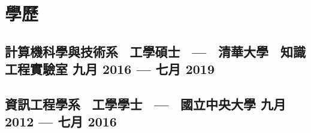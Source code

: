\section{學歷}
\subsection*{計算機科學與技術系 \, 工學碩士 \, --- \, {\normalsize \normalfont 清華大學 \ 知識工程實驗室} \hfill 九月 2016 --- 七月 2019} 
\vspace{0.1cm}
\subsection*{資訊工程學系 \, 工學學士 \, --- \, {\normalsize \normalfont 國立中央大學} \hfill 九月 2012 --- 七月 2016} 
\vspace{0.2cm}
